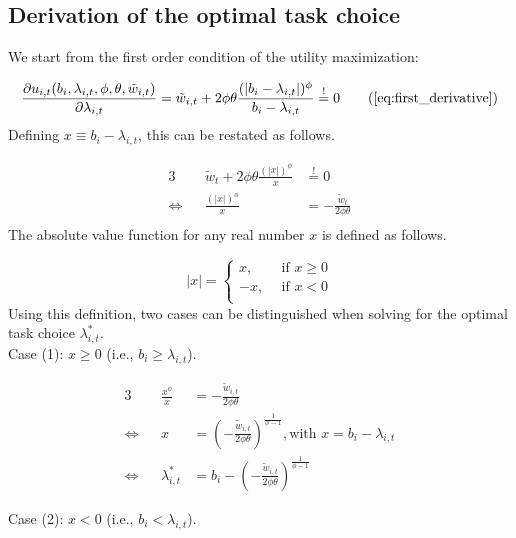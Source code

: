 \documentclass[../main.tex]{subfiles}
\begin{document}
\subsection{Derivation of the optimal task choice} \label{app:derive_lmb_opt}
We start from the first order condition of the utility maximization:

\begin{equation}
	\frac{\partial u_{i, t}(b_i, \lambda_{i,t}, \phi, \theta, \tilde{w}_{i,t})}{\partial \lambda_{i,t}} = \tilde{w}_{i,t} + 2 \phi \theta \frac{(|b_i - \lambda_{i,t}|)^\phi}{b_i - \lambda_{i,t}} \overset{!}{=} 0 \tag{\ref{eq:first_derivative}}
\end{equation}
Defining $x \equiv b_i - \lambda_{i,t}$, this can be restated as follows.

\begin{alignat*}{3}
	{}					&& \tilde{w}_t + 2 \phi \theta \frac{(|x|)^\phi}{x} 	&\overset{!}{=} 0 \\
	\Leftrightarrow 	&& \frac{(|x|)^\phi}{x} 								&= - \frac{\tilde{w}_t}{2 \phi \theta} \label{eq:foc_restated} \\
\end{alignat*}
The absolute value function for any real number $x$ is defined as follows.

\begin{equation}
	|x| = \left\{
		\begin{array}{ll}
			x, \: & \: \text{if $x \geq 0$} \nonumber\\
			-x, \: & \: \text{if $x < 0$} \nonumber\\
		\end{array}
	\right.
\end{equation}
Using this definition, two cases can be distinguished when solving for the optimal task choice $\lambda^*_{i,t}$. \\

Case (1): $x \geq 0$ (i.e., $b_i \geq \lambda_{i,t}$).

\begin{alignat*}{3}
	{}				&& \frac{x^\phi}{x} 	&= - \frac{\tilde{w}_{i,t}}{2 \phi \theta} \\
	\Leftrightarrow && x					&= (- \frac{\tilde{w}_{i,t}}{2 \phi \theta})^{\frac{1}{\phi-1}}, \text{with $x = b_i - \lambda_{i,t}$} \\
	\Leftrightarrow && \lambda^*_{i,t} 		&= b_i - (- \frac{\tilde{w}_{i,t}}{2 \phi \theta})^{\frac{1}{\phi-1}}
\end{alignat*}

Case (2): $x < 0 $ (i.e., $b_i < \lambda_{i,t}$).
\end{document}
